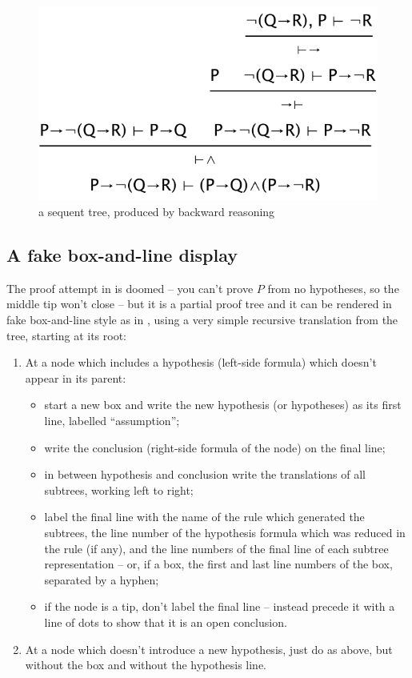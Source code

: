 \documentclass[11pt]{article}
\renewcommand{\picscale}{0.6}
\begin{document}
\begin{figure}
\centering
\includegraphics[scale=\picscale]{pics/firsttree}
\caption{a sequent tree, produced by backward reasoning}
\label{fig:firsttree}
\end{figure}

\subsection{A fake box-and-line display}

The proof attempt in  is doomed -- you can't prove $P$ from no hypotheses, so the middle tip won't close -- but it is a partial proof tree and it can be rendered in fake box-and-line style as in , using a very simple recursive translation from the tree, starting at its root: 
\begin{enumerate}
\item At a node which includes a hypothesis (left-side formula) which doesn't appear in its parent:
\begin{itemize}
\item  start a new box and write the new hypothesis (or hypotheses) as its first line, labelled ``assumption'';
\item write the conclusion (right-side formula of the node) on the final line; 
\item in between hypothesis and conclusion write the translations of all subtrees, working left to right;
\item label the final line with the name of the rule which generated the subtrees, the line number of the hypothesis formula which was reduced in the rule (if any), and the line numbers of the final line of each subtree representation -- or, if a box, the first and last line numbers of the box, separated by a hyphen;
\item if the node is a tip, don't label the final line -- instead precede it with a line of dots to show that it is an open conclusion.
\end{itemize}
\item At a node which doesn't introduce a new hypothesis, just do as above, but without the box and without the hypothesis line.
\end{enumerate}
 
\end{document}
